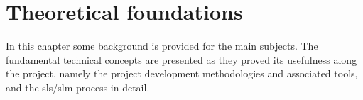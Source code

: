 \chapter{Theoretical foundations}
\label{ch:theor-found}
In this chapter some background is provided for the main subjects. The
fundamental technical concepts are presented as they proved its usefulness along
the project, namely the project development methodologies and associated tools,
and the \gls{sls}/\gls{slm} process in detail.
%

